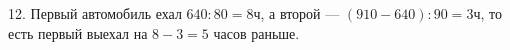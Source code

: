 12. Первый автомобиль ехал $640:80=8$ч, а второй --- $(910-640):90=3$ч, то есть первый выехал на $8-3=5$ часов раньше.\\

